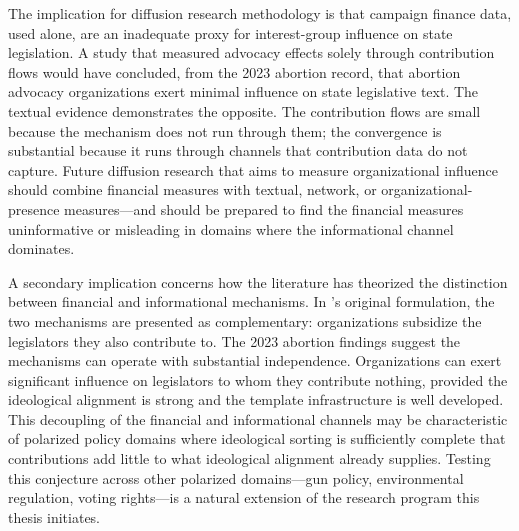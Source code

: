 The implication for diffusion research methodology is that campaign finance data, used alone, are an inadequate proxy for interest-group influence on state legislation. A study that measured advocacy effects solely through contribution flows would have concluded, from the 2023 abortion record, that abortion advocacy organizations exert minimal influence on state legislative text. The textual evidence demonstrates the opposite. The contribution flows are small because the mechanism does not run through them; the convergence is substantial because it runs through channels that contribution data do not capture. Future diffusion research that aims to measure organizational influence should combine financial measures with textual, network, or organizational-presence measures---and should be prepared to find the financial measures uninformative or misleading in domains where the informational channel dominates.
 
A secondary implication concerns how the literature has theorized the distinction between financial and informational mechanisms. In \textcite{hallLobbyingLegislativeSubsidy2006a}'s original formulation, the two mechanisms are presented as complementary: organizations subsidize the legislators they also contribute to. The 2023 abortion findings suggest the mechanisms can operate with substantial independence. Organizations can exert significant influence on legislators to whom they contribute nothing, provided the ideological alignment is strong and the template infrastructure is well developed. This decoupling of the financial and informational channels may be characteristic of polarized policy domains where ideological sorting is sufficiently complete that contributions add little to what ideological alignment already supplies. Testing this conjecture across other polarized domains---gun policy, environmental regulation, voting rights---is a natural extension of the research program this thesis initiates.


